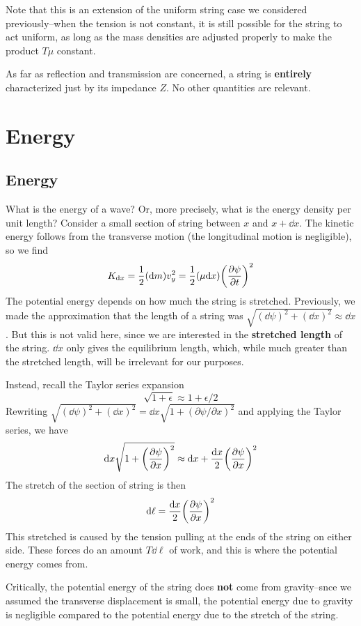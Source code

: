 Note that this is an extension of the uniform string case we considered previously--when the tension is not constant, it is still possible for the string to act uniform, as long as the mass densities are adjusted properly to make the product $T\mu$ constant.

As far as reflection and transmission are concerned, a string is \textbf{entirely} characterized just by its impedance $Z$. No other quantities are relevant. 
\section{Energy}
\subsection*{Energy}
What is the energy of a wave? Or, more precisely, what is the energy density per unit length? Consider a small section of string between $x$ and $x + \dd x$. The kinetic energy follows from the transverse motion (the longitudinal motion is negligible), so we find
\[ K_{\dd x} = \frac{1}{2}(\dd m)v_y^2 = \frac{1}{2}(\mu \dd x) \pqty{\pdv{\psi}{t}}^2 \]
The potential energy depends on how much the string is stretched. Previously, we made the approximation that the length of a string was $\sqrt{(\dd\psi)^2 + (\dd x)^2}\approx \dd x$. But this is not valid here, since we are interested in the \textbf{stretched length} of the string. $\dd x$ only gives the equilibrium length, which, while much greater than the stretched length, will be irrelevant for our purposes.

Instead, recall the Taylor series expansion
\[ \sqrt{1+\epsilon} \approx 1 + \epsilon/2\]
Rewriting $\sqrt{(\dd \psi)^2 + (\dd x)^2} = \dd x\sqrt{1 + (\partial \psi/\partial x)^2}$ and applying the Taylor series, we have
\[ \dd x\sqrt{1 + \pqty{\pdv{\psi}{x}}^2} \approx \dd x + \frac{\dd x}{2} \pqty{\pdv{\psi}{x}}^2\]
The stretch of the section of string is then
\[ \dd \ell = \frac{\dd x}{2} \pqty{\pdv{\psi}{x}}^2 \]
This stretched is caused by the tension pulling at the ends of the string on either side. These forces do an amount $T\dd \ell$ of work, and this is where the potential energy comes from.

Critically, the potential energy of the string does \textbf{not} come from gravity--snce we assumed the transverse displacement is small, the potential energy due to gravity is negligible compared to the potential energy due to the stretch of the string.

